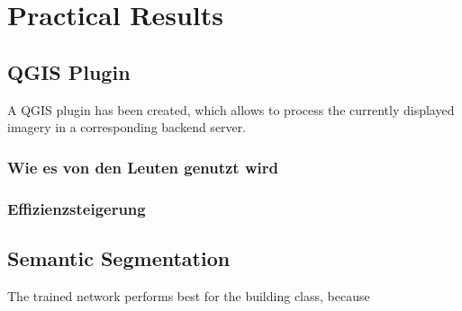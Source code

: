 
\chapter{Practical Results}

\section{QGIS Plugin}
A QGIS plugin has been created, which allows to process the currently displayed imagery in a corresponding backend server.

\subsection{Wie es von den Leuten genutzt wird}

\subsection{Effizienzsteigerung}

\section{Semantic Segmentation}
The trained network performs best for the building class, because 